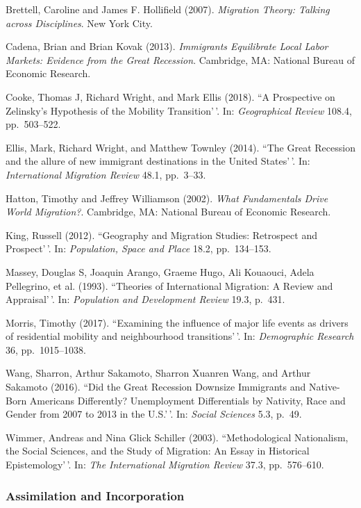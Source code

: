 \documentclass[11pt,]{article}
\begin{document}
Brettell, Caroline and James F. Hollifield (2007).
\emph{Migration Theory: Talking across Disciplines}. New York City.

Cadena, Brian and Brian Kovak (2013).
\emph{Immigrants Equilibrate Local Labor Markets: Evidence from the Great Recession}.
Cambridge, MA: National Bureau of Economic Research.

Cooke, Thomas J, Richard Wright, and Mark Ellis (2018). ``A Prospective
on Zelinsky's Hypothesis of the Mobility Transition'\,'. In:
\emph{Geographical Review} 108.4, pp.~503--522.

Ellis, Mark, Richard Wright, and Matthew Townley (2014). ``The Great
Recession and the allure of new immigrant destinations in the United
States'\,'. In: \emph{International Migration Review} 48.1, pp.~3--33.

Hatton, Timothy and Jeffrey Williamson (2002).
\emph{What Fundamentals Drive World Migration?}. Cambridge, MA: National
Bureau of Economic Research.

King, Russell (2012). ``Geography and Migration Studies: Retrospect and
Prospect'\,'. In: \emph{Population, Space and Place} 18.2, pp.~134--153.

Massey, Douglas S, Joaquin Arango, Graeme Hugo, Ali Kouaouci, Adela
Pellegrino, et al. (1993). ``Theories of International Migration: A
Review and Appraisal'\,'. In: \emph{Population and Development Review}
19.3, p.~431.

Morris, Timothy (2017). ``Examining the influence of major life events
as drivers of residential mobility and neighbourhood transitions'\,'.
In: \emph{Demographic Research} 36, pp.~1015--1038.

Wang, Sharron, Arthur Sakamoto, Sharron Xuanren Wang, and Arthur
Sakamoto (2016). ``Did the Great Recession Downsize Immigrants and
Native-Born Americans Differently? Unemployment Differentials by
Nativity, Race and Gender from 2007 to 2013 in the U.S.'\,'. In:
\emph{Social Sciences} 5.3, p.~49.

Wimmer, Andreas and Nina Glick Schiller (2003). ``Methodological
Nationalism, the Social Sciences, and the Study of Migration: An Essay
in Historical Epistemology'\,'. In:
\emph{The International Migration Review} 37.3, pp.~576--610.

\hypertarget{assimilation-and-incorporation}{%
\subsubsection{Assimilation and
Incorporation}\label{assimilation-and-incorporation}}
\end{document}
